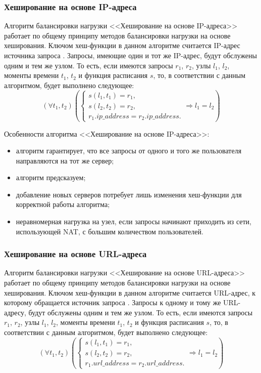 \subsubsection*{Хеширование на основе IP-адреса}

Алгоритм балансировки нагрузки <<Хеширование на основе IP-адреса>> работает по общему принципу методов балансировки нагрузки на основе хеширования.
Ключом хеш-функции в данном алгоритме считается IP-адрес источника запроса \cite{nginx, aws, kemp}.
Запросы, имеющие один и тот же IP-адрес, будут обслужены одним и тем же узлом.
То есть, если имеются запросы $r_1$, $r_2$, узлы $l_1$, $l_2$, моменты времени $t_1$, $t_2$ и функция расписания $s$, то, в соответствии с данным алгоритмом, будет выполнено следующее:
\begin{equation}
    (\forall t_1, t_2) \left(\begin{cases}
        s(l_1, t_1) = r_1, \\
        s(l_2, t_2) = r_2, \\
        r_1.ip\_address = r_2.ip\_address.
    \end{cases} \Rightarrow l_1 = l_2 \right)
\end{equation}

Особенности алгоритма <<Хеширование на основе IP-адреса>>:
\begin{itemize}
    \item алгоритм гарантирует, что все запросы от одного и того же пользователя направляются на тот же сервер;
    \item алгоритм предсказуем;
    \item добавление новых серверов потребует лишь изменения хеш-функции для корректной работы алгоритма;
    \item неравномерная нагрузка на узел, если запросы начинают приходить из сети, использующей NAT, с большим количеством пользователей.
\end{itemize}

\subsubsection*{Хеширование на основе URL-адреса}

Алгоритм балансировки нагрузки <<Хеширование на основе URL-адреса>> работает по общему принципу методов балансировки нагрузки на основе хеширования.
Ключом хеш-функции в данном алгоритме считается URL-адрес, к которому обращается источник запроса \cite{nginx, kemp, haproxy}.
Запросы к одному и тому же URL-адресу, будут обслужены одним и тем же узлом.
То есть, если имеются запросы $r_1$, $r_2$, узлы $l_1$, $l_2$, моменты времени $t_1$, $t_2$ и функция расписания $s$, то, в соответствии с данным алгоритмом, будет выполнено следующее:
\begin{equation}
    (\forall t_1, t_2) \left(\begin{cases}
        s(l_1, t_1) = r_1, \\
        s(l_2, t_2) = r_2, \\
        r_1.url\_address = r_2.url\_address.
    \end{cases} \Rightarrow l_1 = l_2 \right)
\end{equation}

